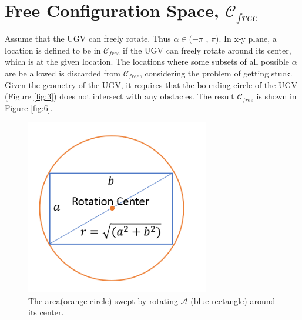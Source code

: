 \documentclass[12pt,draftcls,onecolumn]{IEEEtran}
\begin{document}
\clearpage






\section{Free Configuration Space, $\mathcal{C}_{free}$} 


Assume that the UGV can freely rotate. Thus  $ \alpha  \in (-\pi $ , $\pi) $.
In x-y plane, a location is defined to be in $\mathcal{C}_{free}$ if the UGV can freely rotate around its center, which is at the given location.
The locations where some subsets of all possible $ \alpha$ are be allowed is discarded from $\mathcal{C}_{free}$, considering the problem of getting stuck. 
Given the geometry of the UGV, it requires that the bounding circle of the UGV (Figure \ref{fig:3}) does not intersect with any obstacles.
The result $\mathcal{C}_{free}$ is shown in Figure \ref{fig:6}.

\begin{figure}
 \centering
  \includegraphics[width=8cm]{figures/rot_demo}
  \caption{The area(orange circle) swept by rotating $\mathcal{A}$ (blue rectangle) around  its center. }
  \label{fig:4}
\end{figure}
\end{document}
